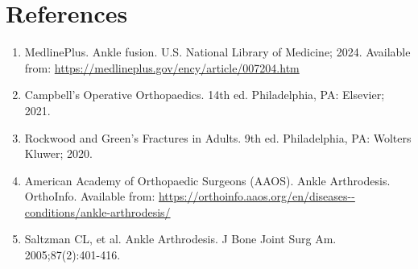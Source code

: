 \section*{References}
\begin{enumerate}
  \item MedlinePlus. Ankle fusion. U.S. National Library of Medicine; 2024. Available from: \url{https://medlineplus.gov/ency/article/007204.htm}
  
  \item Campbell's Operative Orthopaedics. 14th ed. Philadelphia, PA: Elsevier; 2021.
  
  \item Rockwood and Green's Fractures in Adults. 9th ed. Philadelphia, PA: Wolters Kluwer; 2020.
  
  \item American Academy of Orthopaedic Surgeons (AAOS). Ankle Arthrodesis. OrthoInfo. Available from: \url{https://orthoinfo.aaos.org/en/diseases--conditions/ankle-arthrodesis/}
  
  \item Saltzman CL, et al. Ankle Arthrodesis. J Bone Joint Surg Am. 2005;87(2):401-416.
\end{enumerate}

\clearpage
